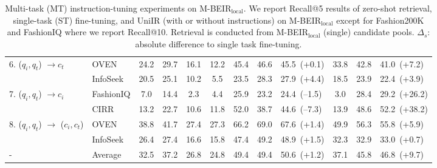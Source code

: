 \begin{table}[ht!]
{\begin{tabular}{llcccc|ccl|ccl}
         \midrule
         \multirow{2}{*}{6. ($q_i, q_t$) $\to c_t$}
         & OVEN                     & 24.2 & 29.7 & 16.1 & 12.2 & 45.4 & 46.6  & 45.5~\textcolor{positive}{\footnotesize (+0.1)} & 33.8 & 42.8 & 41.0~\textcolor{positive}{\footnotesize (+7.2)}\\
         & InfoSeek                 & 20.5 & 25.1 & 10.2 & 5.5 & 23.5 & 28.3  & 27.9~\textcolor{positive}{\footnotesize (+4.4)} & 18.5 & 23.9 & 22.4~\textcolor{positive}{\footnotesize (+3.9)}\\
         \midrule
         \multirow{2}{*}{7. ($q_i, q_t$) $\to c_i$}
         & FashionIQ                & 7.0 & 14.4 & 2.3 & 4.4 & 25.9 & 23.2  & 24.4~\textcolor{negative}{\footnotesize (--1.5)} & 3.0 & 28.4 & 29.2~\textcolor{positive}{\footnotesize (+26.2)}\\
         & CIRR                     & 13.2 & 22.7 & 10.6 & 11.8 & 52.0 & 38.7  & 44.6~\textcolor{negative}{\footnotesize (--7.3)} & 13.9 & 48.6 & 52.2~\textcolor{positive}{\footnotesize (+38.2)}\\
         \midrule
         \multirow{2}{*}{8. ($q_i, q_t$) $\to$ ($c_i, c_t$)}
         & OVEN                     & 38.8 & 41.7 & 27.4 & 27.3 & 66.2 & 69.0  & 67.6~\textcolor{positive}{\footnotesize (+1.4)} & 49.9 & 56.3 & 55.8~\textcolor{positive}{\footnotesize (+5.9)}\\
         &  InfoSeek                & 26.4 & 27.4 & 16.6 & 15.8 & 47.4 & 49.2  & 48.9~\textcolor{positive}{\footnotesize (+1.5)} & 32.3 & 32.9 & 33.0~\textcolor{positive}{\footnotesize (+0.7)}\\
         \midrule
         - &  Average               & 32.5 & 37.2 & 26.8 & 24.8 & 49.4 & 49.4  & 50.6~\textcolor{positive}{\footnotesize (+1.2)} & 37.1 & 45.8 & 46.8~\textcolor{positive}{\footnotesize (+9.7)}\\
         \bottomrule
    \end{tabular}
    }
    \caption{Multi-task (MT) instruction-tuning experiments on M-BEIR$_{\text{local}}$. We report Recall@5 results of zero-shot retrieval, single-task (ST) fine-tuning, and UniIR (with or without instructions) on M-BEIR$_{\text{local}}$ except for Fashion200K and FashionIQ where we report Recall@10. 
    Retrieval is conducted from M-BEIR$_{\text{local}}$  (single) candidate pools. $\Delta_{s}$: absolute difference to single task fine-tuning.
    }
    \label{tab:multitask}
    \vspace{-10pt}
\end{table}



